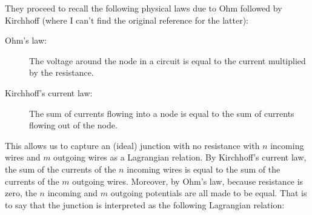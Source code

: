 They proceed to recall the following physical laws due to Ohm \cite{ohm} followed by Kirchhoff (where I can't find the original reference for the latter):
\begin{description}
\item[Ohm's law:]  The voltage around the node in a circuit is equal to the current multiplied by the resistance.
\item[Kirchhoff's current law:] The sum of currents flowing into a node is equal to the sum of currents flowing out of the node.
\end{description}
This allows us to capture an (ideal) junction with no resistance with $n$ incoming wires and $m$ outgoing wires as a Lagrangian relation.  By Kirchhoff's current law, the sum of the currents of the $n$ incoming wires is equal to the sum of the currents of the $m$ outgoing wires.  Moreover, by Ohm's law, because resistance is zero, the $n$ incoming and $m$ outgoing potentials are all made to be equal.  That is to say that the junction is interpreted as the following Lagrangian relation:
